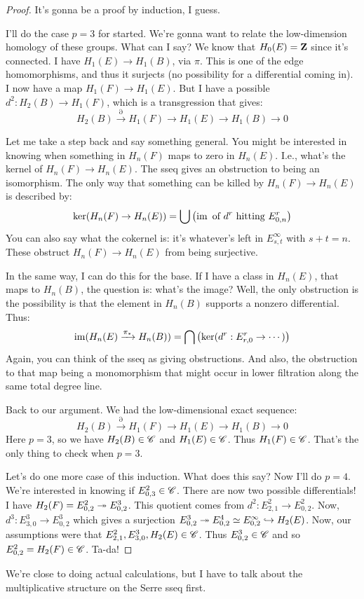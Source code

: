 \begin{proof}
    It's gonna be a proof by induction, I guess.

    I'll do the case $p=3$ for started.
    We're gonna want to relate the low-dimension homology of these groups.
    What can I say?
    We know that $H_0(E) = \mathbf Z$ since it's connected.
    I have $H_1(E)\to H_1(B)$, via $\pi$.
    This is one of the edge homomorphisms, and thus it surjects (no possibility for a differential coming in).
    I now have a map $H_1(F)\to H_1(E)$.
    But I have a possible $d^2:H_2(B)\to H_1(F)$, which is a transgression that gives:
    $$
    H_2(B)\xrightarrow{\partial} H_1(F)\to H_1(E)\to H_1(B)\to 0
    $$
    
    Let me take a step back and say something general.
    You might be interested in knowing when something in $H_n(F)$ maps to zero in $H_n(E)$.
    I.e., what's the kernel of $H_n(F)\to H_n(E)$.
    The sseq gives an obstruction to being an isomorphism.
    The only way that something can be killed by $H_n(F)\to H_n(E)$ is described by:
    $$
    \ker(H_n(F)\to H_n(E)) = \bigcup\left(\operatorname{im} \text{ of }d^r\text{ hitting }E^r_{0,n}\right)
    $$
    You can also say what the cokernel is:
    it's whatever's left in $E^\infty_{s,t}$ with $s+t = n$.
    These obstruct $H_n(F)\to H_n(E)$ from being surjective.
    
    In the same way, I can do this for the base.
    If I have a class in $H_n(E)$, that maps to $H_n(B)$, the question is: what's the image?
    Well, the only obstruction is the possibility is that the element in $H_n(B)$ supports a nonzero differential.
    Thus:
    $$
    \operatorname{im}(H_n(E)\xrightarrow{\pi_\ast} H_n(B)) = \bigcap\left(\ker(d^r:E^r_{r,0}\to\cdots)\right)
    $$
    Again, you can think of the sseq as giving obstructions.
    And also, the obstruction to that map being a monomorphism that might occur in lower filtration along the same total degree line.

    Back to our argument.
    We had the low-dimensional exact sequence:
    $$
    H_2(B)\xrightarrow{\partial} H_1(F)\to H_1(E)\to H_1(B)\to 0
    $$
    Here $p=3$, so we have $H_2(B)\in\mathscr C$ and $H_1(E)\in\mathscr C$.
    Thus $H_1(F)\in\mathscr C$.
    That's the only thing to check when $p=3$.

    Let's do one more case of this induction.
    What does this say?
    Now I'll do $p=4$.
    We're interested in knowing if $E^2_{0,3}\in\mathscr C$.
    There are now two possible differentials!
    I have $H_2(F) = E^2_{0,2}\twoheadrightarrow E^3_{0,2}$.
    This quotient comes from $d^2:E^2_{2,1}\to E^2_{0,2}$.
    Now, $d^3:E^3_{3,0}\to E^3_{0,2}$ which gives a surjection $E^3_{0,2}\twoheadrightarrow E^4_{0,2}\simeq E^\infty_{0,2}\hookrightarrow H_2(E)$.
    Now, our assumptions were that $E^2_{2,1},E^3_{3,0},H_2(E)\in\mathscr C$.
    Thus $E^3_{0,2}\in\mathscr C$ and so $E^2_{0,2} = H_2(F)\in\mathscr C$.
    Ta-da!
\end{proof}
We're close to doing actual calculations, but I have to talk about the multiplicative structure on the Serre sseq first.
